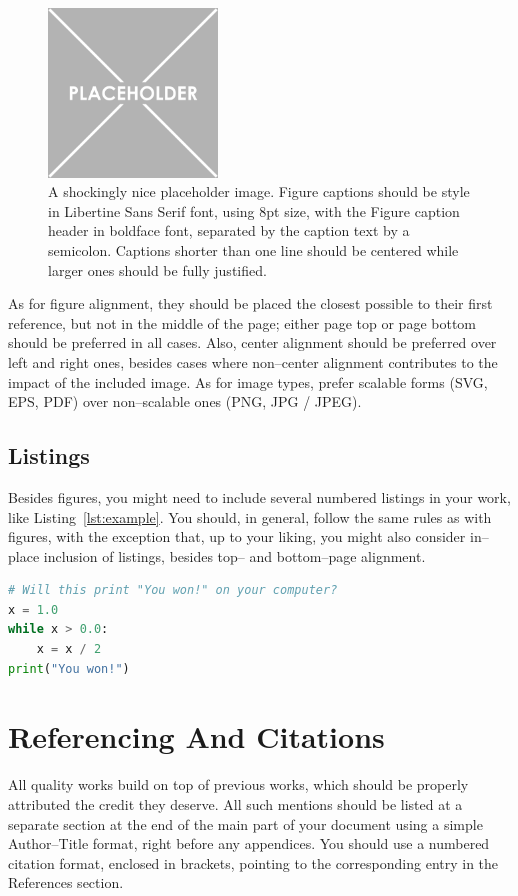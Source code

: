 \documentclass[a4paper, 11pt]{article}
\numberwithin{equation}{section}
\theoremstyle{definition}
\begin{document}
	\begin{figure}[!tb]
		\centering
		\includegraphics[width=0.4\textwidth]{assets/images/placeholder.png}
		\caption{A shockingly nice placeholder image. Figure captions should be style in Libertine Sans Serif font, using 8pt size, with the Figure caption header in boldface font, separated by the caption text by a semicolon. Captions shorter than one line should be centered while larger ones should be fully justified.}
		\label{fig:example}
	\end{figure}

	As for figure alignment, they should be placed the closest possible to their first reference, but not in the middle of the page; either page top or page bottom should be preferred in all cases. Also, center alignment should be preferred over left and right ones, besides cases where non--center alignment contributes to the impact of the included image. As for image types, prefer scalable forms (SVG, EPS, PDF) over non--scalable ones (PNG, JPG / JPEG).
	\subsection{Listings}\label{subsec:Listings}
	Besides figures, you might need to include several numbered listings in your work, like Listing~\ref{lst:example}. You should, in general, follow the same rules as with figures, with the exception that, up to your liking, you might also consider in--place inclusion of listings, besides top-- and bottom--page alignment.
	
	\begin{lstlisting}[language=Python, caption={A small, centered, listing caption.}, label={lst:example}]
# Will this print "You won!" on your computer?
x = 1.0
while x > 0.0:
	x = x / 2
print("You won!")
	\end{lstlisting}
    \section{Referencing And Citations}\label{sec:Referencing and Citations}
    All quality works build on top of previous works, which should be properly attributed the credit they deserve. All such mentions should be listed at a separate section at the end of the main part of your document using a simple Author--Title format, right before any appendices. You should use a numbered citation format, enclosed in brackets, pointing to the corresponding entry in the References section.
	\printbibliography
	\appendix
	\clearpage\newpage
\end{document}
